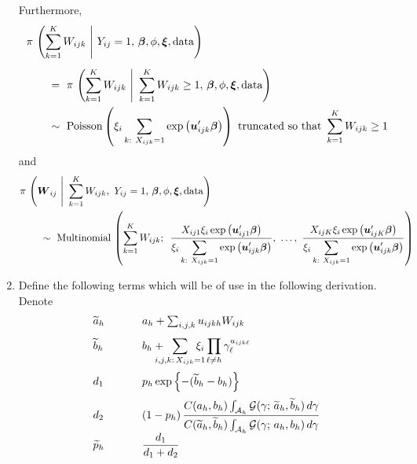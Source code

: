 \documentclass[11pt]{article}
\renewcommand{\vec}{\boldsymbol}
\newcommand{\barBBB}{~\Bigg|~}
\begin{document}
\begin{enumerate}[label=Step \arabic*., leftmargin=13mm, itemsep=10mm]
Furthermore,
\begin{align*} \MoveEqLeft
\pi\,\left( \sum_{k=1}^K W_{ijk} \barBBB Y_{ij} = 1,\, \vec{\beta}, \phi, \vec{\xi}, \text{data} \right) \\[1ex]
&=~ \pi\,\left( \sum_{k=1}^K W_{ijk} \barBBB \sum_{k=1}^K W_{ijk} \geq 1,\, \vec{\beta}, \phi, \vec{\xi}, \text{data} \right) \\
&\sim~ \text{Poisson} \left( \xi_i \sum_{k{:}~ X_{ijk}=1} \exp \left(\vec{u}_{ijk}^\prime \vec{\beta}\right) \right) \text{ truncated so that } \sum_{k=1}^K W_{ijk} \geq 1
\end{align*}
and
\begin{align*} \MoveEqLeft
\pi\,\left( \vec{W}_{ij} \barBBB \sum_{k=1}^K W_{ijk},~  Y_{ij} = 1,\, \vec{\beta}, \phi, \vec{\xi}, \text{data} \right) \\
&\sim~ \text{Multinomial}\, \left( \sum_{k=1}^K W_{ijk};~\, \frac{ X_{ij1} \xi_i \exp \left(\vec{u}_{ij1}^\prime \vec{\beta} \right) }{ \displaystyle \xi_i \sum_{k{:}~ X_{ijk}=1} \exp \left(\vec{u}_{ijk}^\prime \vec{\beta}\right) },~ \dots,~ \frac{ X_{ijK} \xi_i \exp\left( \vec{u}_{ijK}^\prime \vec{\beta} \right) }{ \displaystyle \xi_i \sum_{k{:}~ X_{ijk}=1} \exp \left(\vec{u}_{ijk}^\prime \vec{\beta}\right) } \right)
\end{align*}





\item Define the following terms which will be of use in the following derivation.  Denote
\[ \begin{array}{lll}
\widetilde{a}_h & & a_h + \sum_{i,j,k} u_{ijkh} W_{ijk} \\[2ex]
\widetilde{b}_h & & \displaystyle b_h +\hspace{2mm} \sum_{\mathclap{i,j,k{:}\, X_{ijk}=1}} \hspace{2mm} \xi_i \prod_{\ell \ne h} \gamma_\ell^{ u_{ijk\ell} } \\[4ex]
d_1 & \hspace{5mm} & p_h \exp\left\{ -(\widetilde{b}_h - b_h) \right\} \\[2ex]
d_2 &  & \displaystyle (1 - p_h)\, \frac{ C(a_h,b_h) \int_{\mathcal{A}_h} \mathcal{G}(\gamma;\, \widetilde{a}_h, \widetilde{b}_h)\, d\gamma }{ C(\widetilde{a}_h, \widetilde{b}_h) \int_{\mathcal{A}_h} \mathcal{G}(\gamma;\, a_h, b_h)\, d\gamma } \\[2ex]
\widetilde{p}_h & & \displaystyle \frac{ d_1 }{ d_1 + d_2 }
\end{array} \]



\end{enumerate}
\end{document}

